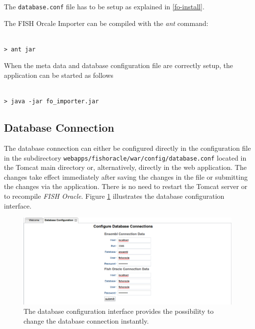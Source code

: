 \documentclass[11pt,final]{article}
\newcommand{\FO}[0]{\emph{FISH Oracle}\xspace}
\begin{document}
The \texttt{database.conf} file has to be setup as explained in
\ref{fo-install}.

The FISH Orcale Importer can be compiled with the \textit{ant} command:

\begin{lstlisting}
  
> ant jar

\end{lstlisting}

When the meta data and database configuration file are correctly setup, the
application can be started as follows

\begin{lstlisting}
  
> java -jar fo_importer.jar

\end{lstlisting}



\subsection{Database Connection}

The database connection can either be configured directly in the configuration
file in the subdirectory \texttt{webapps/fishoracle/war/config/database.conf}
located in the Tomcat main directory or, alternatively, directly in the web
application.
The changes take effect immediately after saving the changes in the file or
submitting the changes via the application. There is no need to restart the
Tomcat server or to recompile \FO. Figure \ref{fig:dbconfig}
illustrates the database configuration interface.

\begin{figure}[h]
	\begin{center}
		\includegraphics[width=\textwidth]{fig/dbconfig.png}
	\end{center}
	\caption{The database configuration interface provides the possibility
	         to change the database connection instantly.}
	\label{fig:dbconfig}
\end{figure}
\end{document}
